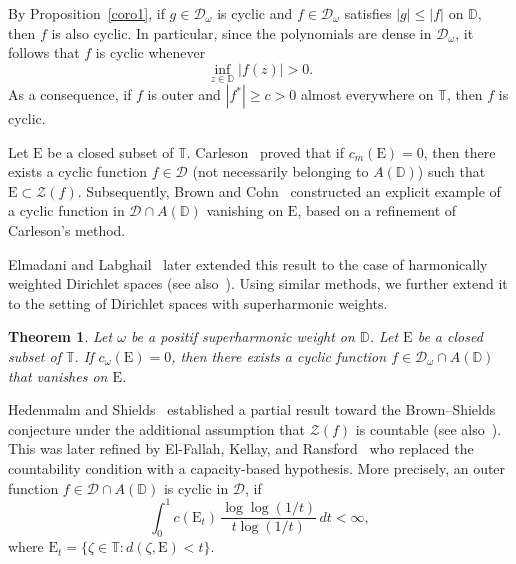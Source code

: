 \documentclass[12pt,reqno,a4paper]{amsart}
\newtheorem{theo}[prop]{Theorem}
\newcommand{\Ee}{\mathrm{E}}
\newcommand\TT{\mathbb{T}}
\newcommand\DD{\mathbb{D}}
\newcommand{\cZ}{{\mathcal{Z}}}
\newcommand{\cD}{{\mathcal{D}}}
\numberwithin{equation}{section}
\begin{document}
	By Proposition~\ref{coro1}, if $g \in \cD_\omega$ is cyclic and $f \in \cD_\omega$ satisfies $|g| \le |f|$ on $\DD$, then $f$ is also cyclic. In particular, since the polynomials are dense in $\cD_\omega$, it follows that $f$ is cyclic whenever
	\[
	\inf_{z \in \DD} |f(z)| > 0.
	\]
	As a consequence, if $f$ is outer and $|f^*| \ge c > 0$ almost everywhere on $\TT$, then $f$ is cyclic.
	
	
	
	Let $\Ee$ be a closed subset of $\TT$. Carleson~\cite{Ca} proved that if $c_m(\Ee) = 0$, then there exists a cyclic function $f \in \cD$ (not necessarily belonging to $A(\DD)$) such that $\Ee \subset \cZ(f)$. Subsequently, Brown and Cohn~\cite{BC} constructed an explicit example of a cyclic function in $\cD \cap A(\DD)$ vanishing on $\Ee$, based on a refinement of Carleson's method.
	
	Elmadani and Labghail~\cite{EL} later extended this result to the case of harmonically weighted Dirichlet spaces (see also~\cite{RY}). Using similar methods, we further extend it to the setting of Dirichlet spaces with superharmonic weights. \begin{theo}\label{Th3}
		Let $\omega$ be a positif superharmonic weight on $\DD$. Let $\Ee$ be a closed subset of $\TT$.  If $c_\omega (\Ee)=0$, then  there exists a cyclic function $f\in\cD_\omega \cap A(\DD)$ that vanishes on $\Ee$. 
	\end{theo}
	
	
	
	Hedenmalm and Shields~\cite{HS} established a partial result toward the Brown--Shields conjecture under the additional assumption that $\cZ(f)$ is countable (see also~\cite{RS3}). This was later refined by El-Fallah, Kellay, and Ransford~\cite{EKR2}  who replaced the countability condition with a capacity-based hypothesis. More precisely, an outer function $f \in \cD \cap A(\DD)$ is cyclic in $\cD$, if 
	\[
	\int_0^1 c(\Ee_t)\, \frac{\log\log(1/t)}{t \log(1/t)} \, dt < \infty,
	\]
	where $\Ee_t = \{\zeta \in \TT : d(\zeta, \Ee) < t\}$.
	
\end{document}
